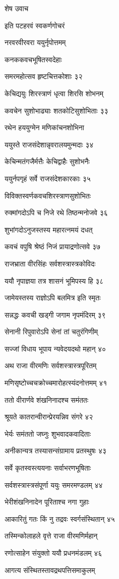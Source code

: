शेष उवाच

इति पटहरवं स्वकर्णगोचरं

नरवरवीरवरा ययुर्नृपोत्तमम्

कनककवचभूषितस्वदेहाः

समरमहोत्सव हृष्टचित्तकोशाः ३२

केचिद्ययुः शिरस्त्राणं धृत्वा शिरसि शोभनम्

कवचेन सुशोभाढ्याः शतकोटिसुशोभिताः ३३

रथेन हययुग्मेन मणिकांचनशोभिना

ययुस्ते राजसंदेशान्नृवरालयमुन्मदाः ३४

केचिन्मतंगजैर्मत्तैः केचिद्वाहैः सुशोभनैः

ययुर्नपगृहं सर्वे राजसंदेशकारकाः ३५

विविक्तस्वर्णकवचशिरस्त्राणसुशोभितः

रुक्मांगदोऽपि च निजे रथे तिष्ठन्मनोजवे ३६

शुभांगदोऽनुजस्तस्य महारत्नमयं दधत्

कवचं वपुषि श्रेष्ठं निजं प्रायाद्रणोत्सवे ३७

राजभ्राता वीरसिंहः सर्वशस्त्रास्त्रकोविदः

ययौ नृपाज्ञया तत्र शासनं भूमिपस्य हि ३८

जामेयस्तस्य राज्ञोऽपि बलमित्र इति स्मृतः

सन्नद्धः कवची खड्गी जगाम नृपमंदिरम् ३९

सेनानी रिपुवारोऽपि सेनां तां चतुरंगिणीम्

सज्जां विधाय भूपाय न्यवेदयदथो महान् ४०

अथ राजा वीरमणिः सर्वशस्त्रास्त्रपूरितम्

मणिसृष्टोच्चचक्रोच्चमारोहत्स्यंदनोत्तमम् ४१

ततो वीरार्णवे शंखनिनादश्च समंततः

श्रूयते कातरान्वीरान्प्रेरयन्निव संगरे ४२

भेर्यः समंततो जघ्नुः शुभवादकवादिताः

अनीकान्यत्र तस्यासन्संग्रामाय प्रतस्थुषः ४३

सर्वे कृतस्वस्त्ययनाः सर्वाभरणभूषिताः

सर्वशस्त्रास्त्रसंपूर्णा ययुः समरमण्डलम् ४४

भेरीशंखनिनादेन पूरिताश्च नगा गुहाः

आकारितुं गतः किं नु तद्रवः स्वर्गसंस्थितान् ४५

तस्मिन्कोलाहले वृत्ते राजा वीरमणिर्महान्

रणोत्साहेन संयुक्तो ययौ प्रधनमंडलम् ४६

आगत्य संस्थितस्तावद्रथपत्तिसमाकुलम्

